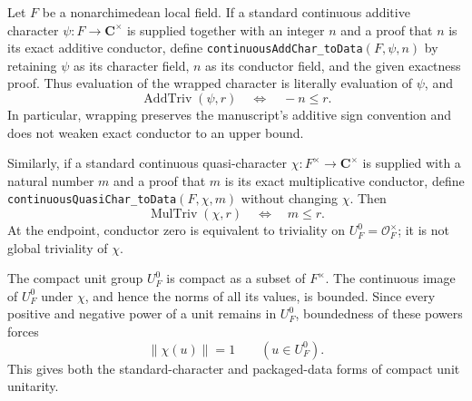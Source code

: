 \begin{theorem}\label{mod:basic-standardcharacterbridge}
Let $F$ be a nonarchimedean local field.  If a standard continuous
additive character $\psi:F\to\mathbf C^\times$ is supplied together with
an integer $n$ and a proof that $n$ is its exact additive conductor, define
\texttt{continuousAddChar\_toData}$(F,\psi,n)$ by retaining $\psi$ as its
character field, $n$ as its conductor field, and the given exactness proof.
Thus evaluation of the wrapped character is literally evaluation of $\psi$,
and
\[
 \operatorname{AddTriv}(\psi,r)\quad\Longleftrightarrow\quad -n\le r.
\]
In particular, wrapping preserves the manuscript's additive sign convention
and does not weaken exact conductor to an upper bound.

Similarly, if a standard continuous quasi-character
$\chi:F^\times\to\mathbf C^\times$ is supplied with a natural number $m$
and a proof that $m$ is its exact multiplicative conductor, define
\texttt{continuousQuasiChar\_toData}$(F,\chi,m)$ without changing $\chi$.
Then
\[
 \operatorname{MulTriv}(\chi,r)\quad\Longleftrightarrow\quad m\le r.
\]
At the endpoint, conductor zero is equivalent to triviality on
$U_F^0=\mathcal O_F^\times$; it is not global triviality of $\chi$.

The compact unit group $U_F^0$ is compact as a subset of $F^\times$.
The continuous image of $U_F^0$ under $\chi$, and hence the norms of all
its values, is bounded.  Since every positive and negative power of a unit
remains in $U_F^0$, boundedness of these powers forces
\[
 \lVert\chi(u)\rVert=1\qquad(u\in U_F^0).
\]
This gives both the standard-character and packaged-data forms of compact
unit unitarity.


\end{theorem}
